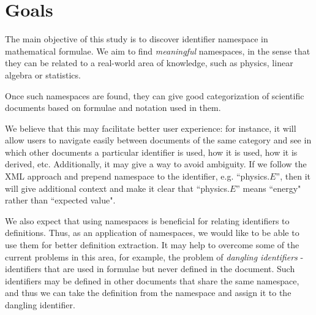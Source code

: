 \section{Goals}

The main objective of this study is to discover identifier namespace in mathematical formulae.
We aim to find \emph{meaningful} namespaces, in the sense that they can be related to a real-world area of knowledge, such as physics, linear algebra or statistics.

Once such namespaces are found, they can give good categorization of scientific documents based on formulae and notation used in them.

We believe that this may facilitate better user experience: for instance, it will allow users to navigate easily between documents of the same category and see in which other documents a particular identifier is used, how it is used, how it is derived, etc. Additionally, it may give a way to avoid ambiguity. If we follow the XML approach \cite{bray1999namespaces} and prepend namespace to the identifier, e.g. ``physics.$E$'', then it will give additional context and make it clear that ``physics.$E$'' means ``energy" rather than ``expected value".

We also expect that using namespaces is beneficial for relating identifiers to definitions. Thus, as an application of namespaces, we would like to be able to use them for better definition extraction. It may help to overcome some of the current problems in this area, for example, the problem of \emph{dangling identifiers} \cite{pagael2014mlp} - identifiers that are used in formulae but never defined in the document. Such identifiers may be defined in other documents that share the same namespace, and thus we can take the definition from the namespace and assign it to the dangling identifier.


